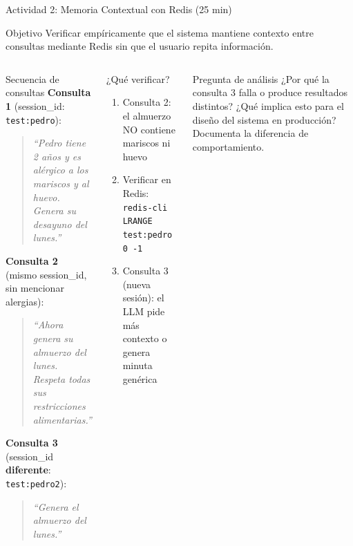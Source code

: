 \documentclass[aspectratio=169]{beamer}
\begin{document}
\begin{frame}{Actividad 2: Memoria Contextual con Redis (25 min)}
  \begin{block}{Objetivo}
    Verificar empíricamente que el sistema mantiene contexto entre
    consultas mediante Redis sin que el usuario repita información.
  \end{block}
  \vspace{0.3em}
  \begin{columns}
    \begin{exampleblock}{Secuencia de consultas}
      \textbf{Consulta 1} (session\_id: \texttt{test:pedro}):
      \begin{quote}
        \scriptsize\itshape
        ``Pedro tiene 2 años y es alérgico a los mariscos
        y al huevo. Genera su desayuno del lunes.''
      \end{quote}
      \vspace{0.4em}
      \textbf{Consulta 2} (mismo session\_id, sin mencionar alergias):
      \begin{quote}
        \scriptsize\itshape
        ``Ahora genera su almuerzo del lunes.
        Respeta todas sus restricciones alimentarias.''
      \end{quote}
      \vspace{0.4em}
      \textbf{Consulta 3} (session\_id \textbf{diferente}: \texttt{test:pedro2}):
      \begin{quote}
        \scriptsize\itshape
        ``Genera el almuerzo del lunes.''
      \end{quote}
    \end{exampleblock}
    \begin{alertblock}{¿Qué verificar?}
      \begin{enumerate}
        \item Consulta 2: el almuerzo NO contiene mariscos ni huevo
        \item Verificar en Redis:\\
              \texttt{redis-cli LRANGE test:pedro 0 -1}
        \item Consulta 3 (nueva sesión): el LLM pide más contexto o genera minuta genérica
      \end{enumerate}
    \end{alertblock}
    \vspace{0.3em}
    \begin{block}{Pregunta de análisis}
      ¿Por qué la consulta 3 falla o produce resultados distintos?
      ¿Qué implica esto para el diseño del sistema en producción?
      Documenta la diferencia de comportamiento.
    \end{block}
  \end{columns}
\end{frame}
\end{document}
